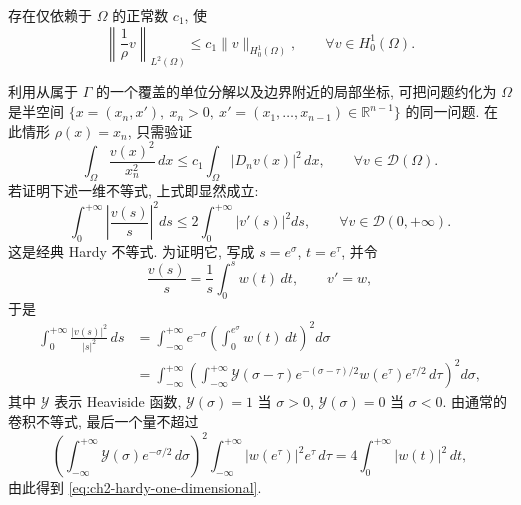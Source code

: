 \begin{Proof}
\begin{Lemma}
\label{lem:ch2-hardy-boundary-inequality}
存在仅依赖于 $\Omega$ 的正常数 $c_1$, 使
\begin{equation}
\left\lVert\frac1\rho v\right\rVert_{L^2(\Omega)}
\leq c_1\lVert v\rVert_{H_0^1(\Omega)},
\qquad\forall v\in H_0^1(\Omega).
\label{eq:ch2-hardy-boundary-inequality}
\end{equation}
\end{Lemma}

\begin{Proof}
利用从属于 $\Gamma$ 的一个覆盖的单位分解以及边界附近的局部坐标, 可把问题约化为 $\Omega$ 是半空间 $\{x=(x_n,x'),\ x_n>0,\ x'=(x_1,\ldots,x_{n-1})\in\mathbb R^{n-1}\}$ 的同一问题. 在此情形 $\rho(x)=x_n$, 只需验证
\begin{equation}
\int_\Omega\frac{v(x)^2}{x_n^2}\,dx
\leq c_1\int_\Omega|D_nv(x)|^2\,dx,
\qquad\forall v\in\mathcal D(\Omega).
\label{eq:ch2-hardy-half-space}
\end{equation}
若证明下述一维不等式, 上式即显然成立:
\begin{equation}
\int_0^{+\infty}\left|\frac{v(s)}s\right|^2ds
\leq2\int_0^{+\infty}|v'(s)|^2ds,
\qquad\forall v\in\mathcal D(0,+\infty).
\label{eq:ch2-hardy-one-dimensional}
\end{equation}
这是经典 Hardy 不等式. 为证明它, 写成 $s=e^\sigma$, $t=e^\tau$, 并令
\[
\frac{v(s)}s=\frac1s\int_0^s w(t)\,dt,
\qquad v'=w,
\]
于是
\[
\begin{aligned}
\int_0^{+\infty}\frac{|v(s)|^2}{|s|^2}\,ds
&=\int_{-\infty}^{+\infty}e^{-\sigma}
\left(\int_0^{e^\sigma}w(t)\,dt\right)^2d\sigma\\
&=\int_{-\infty}^{+\infty}
\left(\int_{-\infty}^{+\infty}
\mathcal Y(\sigma-\tau)e^{-(\sigma-\tau)/2}w(e^\tau)e^{\tau/2}\,d\tau\right)^2d\sigma,
\end{aligned}
\]
其中 $\mathcal Y$ 表示 Heaviside 函数, $\mathcal Y(\sigma)=1$ 当 $\sigma>0$, $\mathcal Y(\sigma)=0$ 当 $\sigma<0$. 由通常的卷积不等式, 最后一个量不超过
\[
\left(\int_{-\infty}^{+\infty}\mathcal Y(\sigma)e^{-\sigma/2}\,d\sigma\right)^2
\int_{-\infty}^{+\infty}|w(e^\tau)|^2e^\tau\,d\tau
=4\int_0^{+\infty}|w(t)|^2\,dt,
\]
由此得到 \eqref{eq:ch2-hardy-one-dimensional}.
\end{Proof}


\end{Proof}
